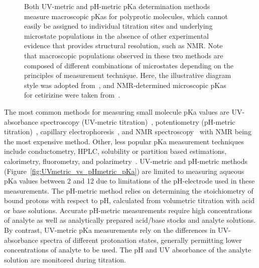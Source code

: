 \documentclass[9pt,lineno]{elife}
\begin{document}
\begin{figure}
\begin{center}
{Both UV-metric and pH-metric pKa determination methods measure macroscopic pKas for polyprotic molecules, which cannot easily be assigned to individual titration sites and underlying microstate populations in the absence of other experimental evidence that provides structural resolution, such as NMR. 
Note that macroscopic populations observed in these two methods are composed of different combinations of microstates depending on the principles of measurement technique.
Here, the illustrative diagram style was adopted from~\citep{rupp_predicting_2011}, and NMR-determined microscopic pKas for cetirizine were taken from~\citep{marosi_triprotic_2009}. 
}
\label{fig:micro_vs_macro_pKa}
\end{center}
\end{figure}

The most common methods for measuring small molecule pKa values are UV-absorbance spectroscopy (UV-metric titration)~\citep{tam_multi-wavelength_2001, allen_multiwavelength_1998,comer_ionization_2014}, potentiometry (pH-metric titration)~\citep{avdeef_ph-metric_1999,comer_ionization_2014}, capillary electrophoresis~\citep{cabot_novel_2015, wan_rapid_2002}, and NMR spectroscopy~\citep{bezencon_pka_2014} with NMR being the most expensive method. Other, less popular pKa measurement techniques include conductometry, HPLC, solubility or partition based estimations, calorimetry, fluorometry, and polarimetry~\citep{reijenga_development_2013}. 
UV-metric and pH-metric methods (Figure~\ref{fig:UVmetric_vs_pHmetric_pKa}) are limited to measuring aqueous pKa values between 2 and 12 due to limitations of the pH-electrode used in these measurements.
The pH-metric method relies on determining the stoichiometry of bound protons with respect to pH, calculated from volumetric titration with acid or base solutions. Accurate pH-metric measurements require high concentrations of analyte as well as analytically prepared acid/base stocks and analyte solutions. 
By contrast, UV-metric pKa measurements rely on the differences in UV-absorbance spectra of different protonation states, generally permitting lower concentrations of analyte to be used.
The pH and UV absorbance of the analyte solution are monitored during titration. 
\end{document}
